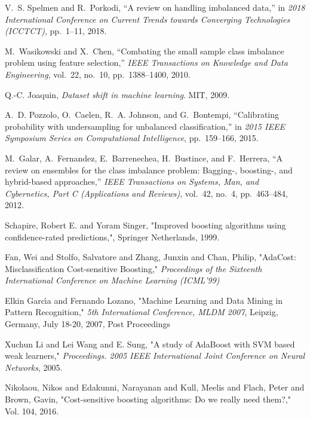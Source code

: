 \documentclass[conference]{IEEEtran}
\begin{document}
\begin{thebibliography}{1}

 V.~S. {Spelmen} and R.~{Porkodi}, ``A review on handling imbalanced data,'' in
   {\em 2018 International Conference on Current Trends towards Converging
   Technologies (ICCTCT)}, pp.~1--11, 2018.

 M.~{Wasikowski} and X.~{Chen}, ``Combating the small sample class imbalance
   problem using feature selection,'' {\em IEEE Transactions on Knowledge and
   Data Engineering}, vol.~22, no.~10, pp.~1388--1400, 2010.

 Q.-C. Joaquin, {\em Dataset shift in machine learning}.
 \newblock MIT, 2009.

 A.~D. {Pozzolo}, O.~{Caelen}, R.~A. {Johnson}, and G.~{Bontempi}, ``Calibrating
   probability with undersampling for unbalanced classification,'' in {\em 2015
   IEEE Symposium Series on Computational Intelligence}, pp.~159--166, 2015.

 M.~{Galar}, A.~{Fernandez}, E.~{Barrenechea}, H.~{Bustince}, and F.~{Herrera},
   ``A review on ensembles for the class imbalance problem: Bagging-, boosting-,
   and hybrid-based approaches,'' {\em IEEE Transactions on Systems, Man, and
   Cybernetics, Part C (Applications and Reviews)}, vol.~42, no.~4,
   pp.~463--484, 2012.
   
 Schapire, Robert E. and Yoram Singer, "Improved boosting algorithms using confidence-rated predictions,", Springer Netherlands, 1999.
 
  Fan, Wei and Stolfo, Salvatore and Zhang, Junxin and Chan, Philip,
  "AdaCost: Misclassification Cost-sensitive Boosting,"
  {\em Proceedings of the Sixteenth International Conference on Machine Learning (ICML'99)}
  
   Elkin Garc{\'{\i}}a and Fernando Lozano,
   "Machine Learning and Data Mining in Pattern Recognition,"
   {\em 5th International Conference, {MLDM} 2007}, Leipzig, Germany, July 18-20, 2007, Post Proceedings
   
    {Xuchun Li} and {Lei Wang} and E. {Sung},
    "A study of AdaBoost with SVM based weak learners,"
    {\em Proceedings. 2005 IEEE International Joint Conference on Neural Networks}, 2005.
    
Nikolaou, Nikos and Edakunni, Narayanan and Kull, Meelis and Flach, Peter and Brown, Gavin, 
"Cost-sensitive boosting algorithms: Do we really need them?," Vol. 104, 2016.



\end{thebibliography}
\end{document}
